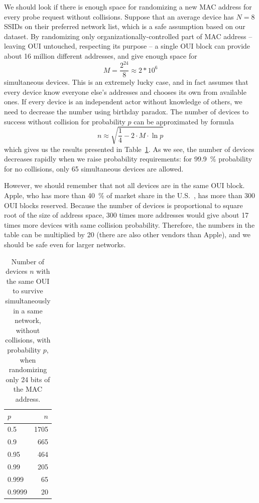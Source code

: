 \documentclass[12pt,a4paper,oneside,pdftex]{report}
\begin{document}
We should look if there is enough space for randomizing a new MAC address for every probe request without collisions. Suppose that an average device has $N = 8$ SSIDs on their preferred network list, which is a safe assumption based on our dataset. By randomizing only organizationally-controlled part of MAC address -- leaving OUI untouched, respecting its purpose -- a single OUI block can provide about 16 million different addresses, and give enough space for
$$M = \frac{2^{24}}{8} \approx 2*10^6$$
simultaneous devices. This is an extremely lucky case, and in fact assumes that every device know everyone else's addresses and chooses its own from available ones. If every device is an independent actor without knowledge of others, we need to decrease the number using birthday paradox. The number of devices to success without collision for probability $p$ can be approximated by formula~\cite{mathis1991generalized} 
$$n \approx \sqrt{\frac{1}{4} - 2 \cdot M \cdot \ln p}$$ 
which gives us the results presented in Table~\ref{tab:prob_random}. As we see, the number of devices decreases rapidly when we raise probability requirements: for 99.9~\% probability for no collisions, only 65 simultaneous devices are allowed.

However, we should remember that not all devices are in the same OUI block. Apple, who has more than 40~\% of market share in the U.S.~\cite{comscore2014}, has more than 300 OUI blocks reserved. Because the number of devices is proportional to square root of the size of address space, 300 times more addresses would give about 17 times more devices with same collision probability. Therefore, the numbers in the table can be multiplied by 20 (there are also other vendors than Apple), and we should be safe even for larger networks.


\begin{table}[ht]
\center
\begin{tabular}{|l|r|}
    \hline
    $p$ & $n$   \\ \hline
    0.5 & 1705  \\ \hline
    0.9 & 665   \\ \hline
    0.95 & 464  \\ \hline
    0.99 & 205  \\ \hline
    0.999 & 65  \\ \hline
    0.9999 & 20 \\ \hline
\end{tabular}
\caption{Number of devices $n$ with the same OUI to survive simultaneously in a same network, without collisions, with probability $p$, when randomizing only 24 bits of the MAC address.}
\label{tab:prob_random}
\end{table}
\end{document}
